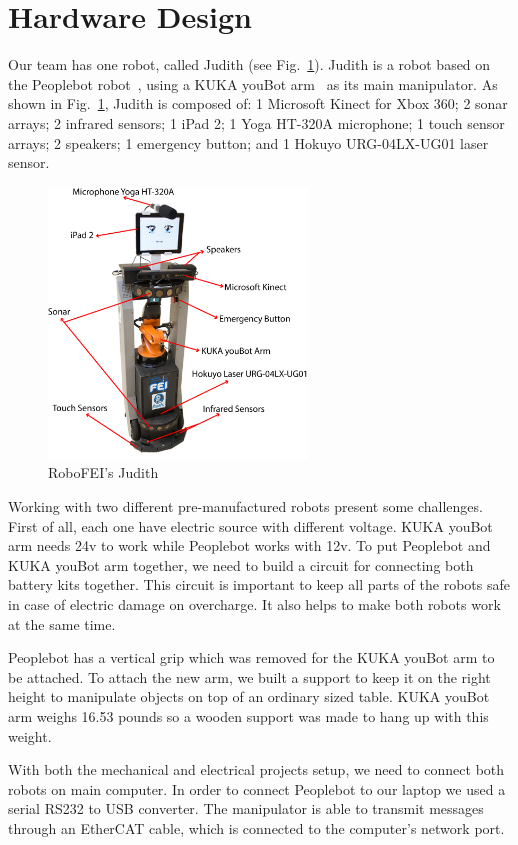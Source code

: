 \section{Hardware Design}

Our team has one robot, called Judith (see Fig.~\ref{fig:judith}). Judith is a robot based on the Peoplebot robot~\cite{peoplebot:2001}, using a KUKA youBot arm~\cite{youbot:2016} as its main manipulator. As shown in Fig.~\ref{fig:judith}, Judith is composed of: 1 Microsoft Kinect for Xbox 360; 2 sonar arrays; 2 infrared sensors; 1 iPad 2; 1 Yoga HT-320A microphone; 1 touch sensor arrays; 2 speakers; 1 emergency button; and 1 Hokuyo URG-04LX-UG01 laser sensor.

\begin{figure}[ht!]
    \centering
    \includegraphics[height = 7.2cm]{figures/judith_info.png}
    \caption{RoboFEI's Judith}
    \label{fig:judith}
\end{figure}

Working with two different pre-manufactured robots present some challenges. First of all, each one have electric source with different voltage. KUKA youBot arm needs 24v to work while Peoplebot works with 12v. To put Peoplebot and KUKA youBot arm together, we need to build a circuit for connecting both battery kits together. This circuit is important to keep all parts of the robots safe in case of electric damage on overcharge. It also helps to make both robots work at the same time.

Peoplebot has a vertical grip which was removed for the KUKA youBot arm to be attached. To attach the new arm, we built a support to keep it on the right height to manipulate objects on top of an ordinary sized table. KUKA youBot arm weighs 16.53 pounds so a wooden support was made to hang up with this weight.

With both the mechanical and electrical projects setup, we need to connect both robots on main computer. In order to connect Peoplebot to our laptop we used a serial RS232 to USB converter. The manipulator is able to transmit messages through an EtherCAT cable, which is connected to the computer's network port.

